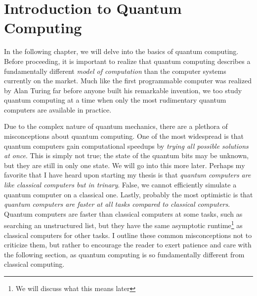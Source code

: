 \documentclass[12pt,twoside]{reedthesis}
\begin{document}
    \tableofcontents

	

  \mainmatter %
  \pagestyle{fancyplain} %


	
\chapter{Introduction to Quantum Computing}


In the following chapter, we will delve into the basics of quantum computing. Before proceeding, it is important to realize that quantum computing describes a  fundamentally different \textit{model of computation} than the computer systems currently on the market. Much like the first programmable computer was realized by Alan Turing far before anyone built his remarkable invention, we too study quantum computing at a time when only the most rudimentary quantum computers are available in practice.


Due to the complex nature of quantum mechanics, there are a plethora of misconceptions about quantum computing. One of the most widespread is that quantum computers gain computational speedups by \textit{trying all possible solutions at once}. This is simply not true; the state of the quantum bits may be unknown, but they are still in only one state. We will go into this more later. Perhaps my favorite that I have heard upon starting my thesis is that \textit{quantum computers are like classical computers but in trinary}. False, we cannot efficiently simulate a quantum computer on a classical one. Lastly, probably the most optimistic is that \textit{quantum computers are faster at all tasks compared to classical computers}. Quantum computers are faster than classical computers at some tasks, such as searching an unstructured list, but they have the same asymptotic runtime\footnote{We will discuss what this means later} as classical computers for other tasks. I outline these common misconceptions not to criticize them, but rather to encourage the reader to exert patience and care with the following section, as quantum computing is so fundamentally different from classical computing.
\end{document}
